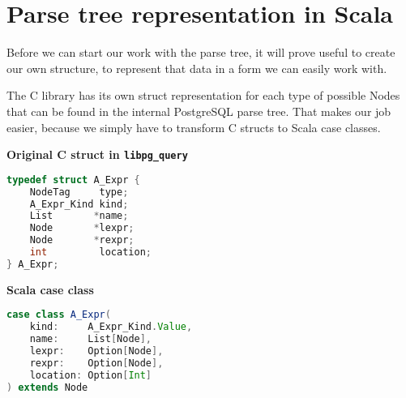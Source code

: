 \section{Parse tree representation in Scala}
Before we can start our work with the parse tree, it will prove useful to create our own structure, to represent that data in a form we can easily work with. 

The C library has its own struct representation for each type of possible Nodes that can be found in the internal PostgreSQL parse tree. That makes our job easier, because we simply have to transform C structs to Scala case classes.

\bigskip
\textbf{Original C struct in \texttt{libpg\_query}}
\begin{lstlisting}[language=C, basicstyle=\ttfamily]      
typedef struct A_Expr {
    NodeTag     type;
    A_Expr_Kind kind;
    List       *name; 
    Node       *lexpr; 
    Node       *rexpr; 
    int         location; 
} A_Expr;
\end{lstlisting}

\textbf{Scala case class}
\begin{lstlisting}[language=scala, basicstyle=\ttfamily]
case class A_Expr(
    kind:     A_Expr_Kind.Value,
    name:     List[Node],
    lexpr:    Option[Node],
    rexpr:    Option[Node],
    location: Option[Int]
) extends Node
\end{lstlisting}